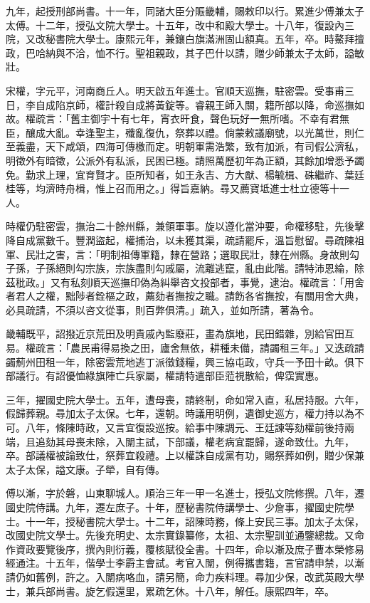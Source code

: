 \begin{pinyinscope}
九年，起授刑部尚書。十一年，同諸大臣分賑畿輔，賜敕印以行。累進少傅兼太子太傅。十二年，授弘文院大學士。十五年，改中和殿大學士。十八年，復設內三院，又改秘書院大學士。康熙元年，兼鑲白旗滿洲固山額真。五年，卒。時鰲拜擅政，巴哈納與不洽，恤不行。聖祖親政，其子巴什以請，贈少師兼太子太師，謚敏壯。

宋權，字元平，河南商丘人。明天啟五年進士。官順天巡撫，駐密雲。受事甫三日，李自成陷京師，權計殺自成將黃錠等。睿親王師入關，籍所部以降，命巡撫如故。權疏言：「舊主御宇十有七年，宵衣旰食，聲色玩好一無所嗜。不幸有君無臣，釀成大亂。幸逢聖主，殲亂復仇，祭葬以禮。倘蒙敕議廟號，以光萬世，則仁至義盡，天下咸頌，四海可傳檄而定。明朝軍需浩繁，致有加派，有司假公濟私，明徵外有暗徵，公派外有私派，民困已極。請照萬歷初年為正額，其餘加增悉予蠲免。勤求上理，宜育賢才。臣所知者，如王永吉、方大猷、楊毓楫、硃繼祚、葉廷桂等，均濟時舟楫，惟上召而用之。」得旨嘉納。尋又薦寶坻進士杜立德等十一人。

時權仍駐密雲，撫治二十餘州縣，兼領軍事。旋以遵化當沖要，命權移駐，先後擊降自成黨數千。豐潤盜起，權捕治，以未獲其渠，疏請罷斥，溫旨慰留。尋疏陳祖軍、民壯之害，言：「明制祖傳軍籍，隸在營路；選取民壯，隸在州縣。身故則勾子孫，子孫絕則勾宗族，宗族盡則勾戚屬，流離逃竄，亂由此階。請特沛恩綸，除茲秕政。」又有私刻順天巡撫印偽為糾舉咨文投部者，事覺，逮治。權疏言：「用舍者君人之權，黜陟者銓樞之政，薦劾者撫按之職。請飭各省撫按，有關用舍大典，必具疏請，不須以咨文從事，則百弊俱清。」疏入，並如所請，著為令。

畿輔既平，詔撥近京荒田及明貴戚內監廢莊，畫為旗地，民田錯雜，別給官田互易。權疏言：「農民甫得易換之田，廬舍無依，耕種未備，請蠲租三年。」又迭疏請蠲薊州田租一年，除密雲荒地逃丁派徵錢糧，興三協屯政，守兵一予田十畝。俱下部議行。有詔優恤綠旗陣亡兵家屬，權請特遣部臣蒞視散給，俾霑實惠。

三年，擢國史院大學士。五年，遭母喪，請終制，命如常入直，私居持服。六年，假歸葬親。尋加太子太保。七年，還朝。時議用明例，遺御史巡方，權力持以為不可。八年，條陳時政，又言宜復設巡按。給事中陳調元、王廷諫等劾權前後持兩端，且追劾其母喪未除，入闈主試，下部議，權老病宜罷歸，遂命致仕。九年，卒。部議權被論致仕，祭葬宜殺禮。上以權誅自成黨有功，賜祭葬如例，贈少保兼太子太保，謚文康。子犖，自有傳。

傅以漸，字於磐，山東聊城人。順治三年一甲一名進士，授弘文院修撰。八年，遷國史院侍講。九年，遷左庶子。十年，歷秘書院侍講學士、少詹事，擢國史院學士。十一年，授秘書院大學士。十二年，詔陳時務，條上安民三事。加太子太保，改國史院文學士。先後充明史、太宗實錄纂修，太祖、太宗聖訓並通鑒總裁。又命作資政要覽後序，撰內則衍義，覆核賦役全書。十四年，命以漸及庶子曹本榮修易經通注。十五年，偕學士李霨主會試。考官入闈，例得攜書籍，言官請申禁，以漸請仍如舊例，許之。入闈病咯血，請另簡，命力疾料理。尋加少保，改武英殿大學士，兼兵部尚書。旋乞假還里，累疏乞休。十八年，解任。康熙四年，卒。


\end{pinyinscope}
